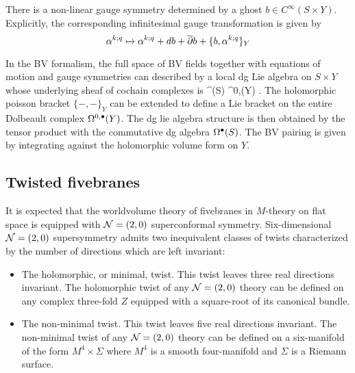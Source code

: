\documentclass[11pt]{amsart}%
\begin{document}
%

There is a non-linear gauge symmetry determined by a ghost $b \in C^\infty (S\times Y)$. 
Explicitly, the corresponding infinitesimal gauge transformation is given by
\[
\alpha^{k;q}\mapsto \alpha^{k;q} + db+\overline{\partial} b + \{b, \alpha^{k;q}\}_{Y}
\]

In the BV formalism, the full space of BV fields together with equations of motion and gauge symmetries can described by a local dg Lie algebra on $S\times Y$ whose underlying sheaf of cochain complexes is
\beqn
\Omega^\bu(S) \hotimes \Omega^{0,\bu}(Y) .
\eeqn
The holomorphic poisson bracket $\{-,-\}_{Y}$ can be extended to define a Lie bracket on the entire Dolbeault complex $\Omega^{0,\bullet}(Y)$.
The dg lie algebra structure is then obtained by the tensor product with the commutative dg algebra $\Omega^\bullet(S)$. 
The BV pairing is given by integrating against the holomorphic volume form on $Y$.

\subsection{Twisted fivebranes} 


It is expected that the worldvolume theory of fivebranes in $M$-theory on flat space is equipped with $\mathcal N=(2,0)$ superconformal symmetry. 
Six-dimensional $\mathcal N=(2,0)$ supersymmetry admits two inequivalent classes of twists characterized by the number of directions which are left invariant:
\begin{itemize}
\item 
The holomorphic, or minimal, twist. 
This twist leaves three real directions invariant. 
The holomorphic twist of any $\mathcal N=(2,0)$ theory can be defined on any complex three-fold $Z$ equipped with a square-root of its canonical bundle. 
\item 
The non-minimal twist. 
This twist leaves five real directions invariant.
The non-minimal twist of any $\mathcal N=(2,0)$ theory can be defined on a six-manifold of the form $M^4 \times \Sigma$ where $M^4$ is a smooth four-manifold and $\Sigma$ is a Riemann surface. 
\end{itemize}
\end{document}
